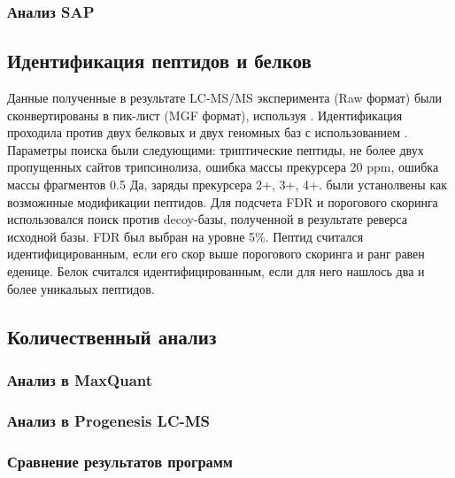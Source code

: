 \subsubsection{Анализ SAP}

\subsection{Идентификация пептидов и белков}
Данные полученные в результате LC-MS/MS эксперимента (Raw формат) были сконвертированы в пик-лист (MGF формат), используя  \cite{chambers2012cross}. Идентификация проходила против двух белковых и двух геномных баз с использованием  \cite{cottrell1999probability}. Параметры поиска были следующими: триптические пептиды, не более двух пропущенных сайтов трипсинолиза, ошибка массы прекурсера 20 ppm, ошибка массы фрагментов 0.5 Да, заряды прекурсера 2+, 3+, 4+.  были устанолвены как возможнные модификации пептидов. Для подсчета FDR и порогового скоринга использовался поиск против decoy-базы, полученной в результате реверса исходной базы. FDR был выбран на уровне 5\%.
Пептид считался идентифицированным, если его скор выше порогового скоринга и ранг равен еденице. Белок считался идентифицированным, если для него нашлось два и более уникальых пептидов.

\subsection{Количественный анализ}
\subsubsection{Анализ в MaxQuant}
\subsubsection{Анализ в Progenesis LC-MS}
\subsubsection{Сравнение результатов программ}




\newpage
